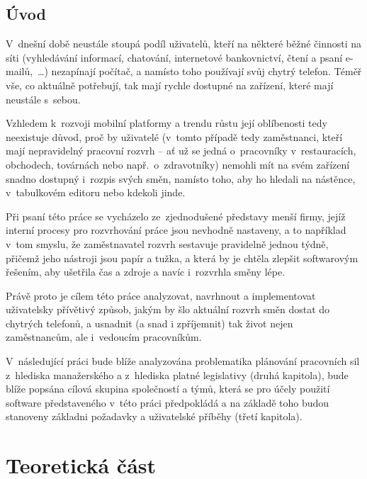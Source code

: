 \documentclass[twoside]{ctuthesis}
\begin{document}

%
\chapter*{Úvod}

V~dnešní době neustále stoupá podíl uživatelů, kteří na některé běžné činnosti na síti (vyhledávání informací, chatování, internetové bankovnictví, čtení a psaní e-mailů,~\ldots) nezapínají počítač, a namísto toho používají svůj chytrý telefon. Téměř vše, co aktuálně potřebují, tak mají rychle dostupné na zařízení, které mají neustále s~sebou.

Vzhledem k~rozvoji mobilní platformy a trendu růstu její oblíbenosti tedy neexistuje důvod, proč by uživatelé (v~tomto případě tedy zaměstnanci, kteří mají nepravidelný pracovní rozvrh -- ať už se jedná o~pracovníky v~restauracích, obchodech, továrnách nebo např.~o~zdravotníky) nemohli mít na svém zařízení snadno dostupný i~rozpis svých směn, namísto toho, aby ho hledali na nástěnce, v~tabulkovém editoru nebo kdekoli jinde.

Při psaní této práce se vycházelo ze~zjednodušené představy menší firmy, jejíž interní procesy pro rozvrhování práce jsou nevhodně nastaveny, a to například v~tom smyslu, že zaměstnavatel rozvrh sestavuje pravidelně jednou týdně, přičemž jeho nástroji jsou papír a tužka, a která by je chtěla zlepšit softwarovým řešením, aby ušetřila čas a zdroje a navíc i~rozvrhla směny lépe.

Právě proto je cílem této práce analyzovat, navrhnout a im\-ple\-men\-to\-vat uživatelsky přívětivý způsob, jakým by šlo aktuální rozvrh směn dostat do chytrých telefonů, a usnadnit (a snad i zpříjemnit) tak život nejen zaměstnancům, ale i~vedoucím pracovníkům.

V~následující práci bude blíže analyzována problematika plánování pracovních sil z~hlediska manažerského a z~hlediska platné legislativy (druhá kapitola), bude blíže popsána cílová skupina společností a týmů, která se pro účely použití software představeného v~této práci předpokládá a na základě toho budou stanoveny základni požadavky a uživatelské příběhy (třetí kapitola).


\part{Teoretická část}
\end{document}
